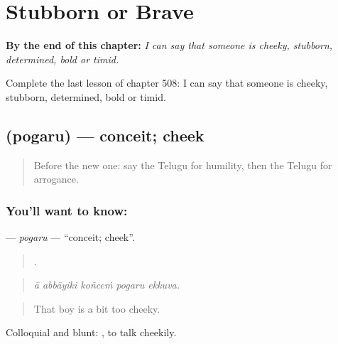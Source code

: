 
\chapter{Stubborn or Brave}
\label{ch:te-stubborn-or-brave}

\begin{chapteropening}
\textbf{By the end of this chapter:} \emph{I can say that someone is cheeky, stubborn, determined, bold or timid.}

Complete the last lesson of chapter 508: I can say that someone is cheeky, stubborn, determined, bold or timid.
\end{chapteropening}

\section[\texorpdfstring{\te{పొగరు} (pogaru)}{పొగరు (pogaru)}]{ (pogaru) — conceit; cheek}

\label{lesson:TE-C508-pogaru}



\begin{quote}
Before the new one: say the Telugu for humility, then the Telugu for arrogance.
\end{quote}

\subsection*{You'll want to know: }
\textbf{} — \emph{pogaru} — \textquotedblleft{}conceit; cheek\textquotedblright{}.

\begin{quote}
    .
\end{quote}

\begin{quote}
\emph{ā abbāyiki koñceṁ pogaru ekkuva.}
\end{quote}

\begin{quote}
That boy is a bit too cheeky.
\end{quote}

Colloquial and blunt:  , to talk cheekily.

